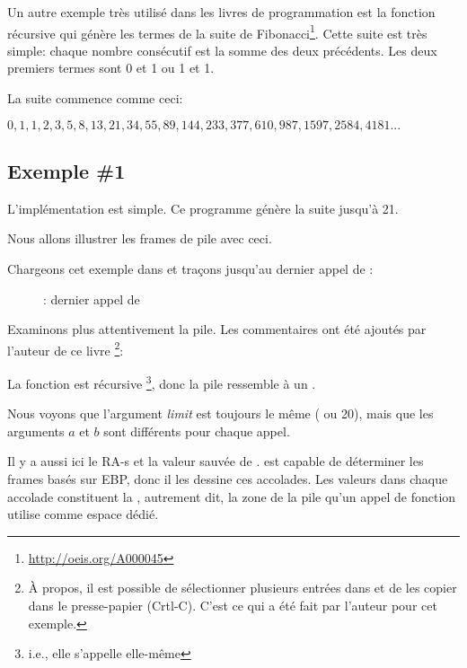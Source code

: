 
Un autre exemple très utilisé dans les livres de programmation est la fonction récursive
qui génère les termes de la suite de Fibonacci\footnote{\url{http://oeis.org/A000045}}.
Cette suite est très simple: chaque nombre consécutif est la somme des deux précédents.
Les deux premiers termes sont 0 et 1 ou 1 et 1.

La suite commence comme ceci:

\begin{center}
$0, 1, 1, 2, 3, 5, 8, 13, 21, 34, 55, 89, 144, 233, 377, 610, 987, 1597, 2584, 4181 ...$
\end{center}

\subsection{Exemple \#1}

L'implémentation est simple. Ce programme génère la suite jusqu'à 21.





Nous allons illustrer les frames de pile avec ceci.

\clearpage

Chargeons cet exemple dans \olly et traçons jusqu'au dernier appel de \ttf{}:

\begin{figure}[H]
\centering
{}
\caption{\olly: dernier appel de \ttf{}}
\label{fig:fib_olly}
\end{figure}

\clearpage
Examinons plus attentivement la pile.
Les commentaires ont été ajoutés par l'auteur de ce livre
\footnote{ À propos, il est possible de sélectionner plusieurs entrées dans \olly
et de les copier dans le presse-papier (Crtl-C).
C'est ce qui a été fait par l'auteur pour cet exemple.}:



La fonction est récursive \footnote{i.e., elle s'appelle elle-même}, donc la pile
ressemble à un .

Nous voyons que l'argument \emph{limit} est toujours le même ( ou 20), mais
que les arguments $a$ et $b$ sont différents pour chaque appel.

Il y a aussi ici le \ac{RA}-s et la valeur sauvée de \EBP.
\olly est capable de déterminer les frames basés sur EBP, donc il les dessine ces
accolades. Les valeurs dans chaque accolade constituent la ,
autrement dit, la zone de la pile qu'un appel de fonction utilise comme espace dédié.

